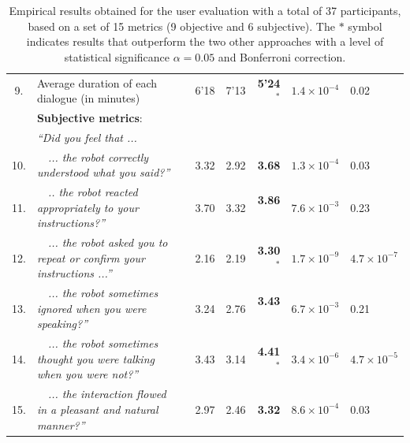\begin{table}
\begin{tabular}{|cp{110mm}c|r:r:r|p{16mm}|p{16mm}|}
9.& Average duration of each dialogue  (in minutes) \vspace{3mm} && 6'18 & 7'13 &\textbf{ 5'24}$^{\mathbf{*}}$ & $1.4\!\times\!10^{-4}$ & 0.02 \\ \hdashline
& \vspace{-2mm} \textbf{Subjective metrics}:  && & & & & \\ 
&\textit{``Did you feel that ...}  && & & & & \\ 
10.&\ \ \textit{... the robot correctly understood what you said?''}  && 3.32 & 2.92 &  \textbf{3.68} & $1.3\!\times\!10^{-4}$ & 0.03 \\
11.& \ \ \textit{.. the robot reacted appropriately to your instructions?''}   && 3.70 & 3.32 & \textbf{3.86}$^{\phantom{*}}$ & $7.6\!\times\!10^{-3}$ & 0.23 \\
12.&\ \ \textit{... the robot asked you to repeat or confirm your instructions ...''}   & & 2.16 & 2.19 & \textbf{3.30}$^{\mathbf{*}}$ & $1.7\!\times\!10^{-9}$ & $4.7\!\times\!10^{-7}$ \\
13.&\ \ \textit{... the robot sometimes ignored when you were speaking?''}  & & 3.24 & 2.76 & \textbf{3.43}$^{\phantom{*}}$ & $6.7\!\times\!10^{-3}$ & 0.21 \\
14.&\ \ \textit{... the robot sometimes thought you were talking when you were not?''}  & & 3.43 & 3.14 & \textbf{4.41}$^{\mathbf{*}}$ & $3.4\!\times\!10^{-6}$ & $4.7\!\times\!10^{-5}$ \\
15.&\ \ \textit{... the interaction flowed in a pleasant and natural manner?''} \vspace{3mm}  & & 2.97 & 2.46 & \textbf{3.32} & $8.6\!\times\!10^{-4}$ & 0.03 \\ \hline
\end{tabular} \vspace{3mm}
\label{table:results_exp3}
\caption{Empirical results obtained for the user evaluation with a total of 37 participants, based on a set of 15 metrics (9 objective and 6 subjective). The $\mathbf{*}$ symbol indicates results that outperform the two other approaches with a level of statistical significance $\alpha = 0.05$ and Bonferroni correction. }
\end{table}

